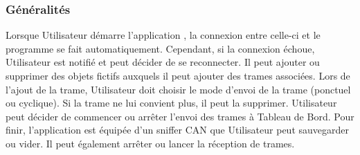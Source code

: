 \subsubsection{Généralités}
Lorsque Utilisateur démarre l'application {\nomApplication}, la connexion entre celle-ci et le programme {\nomLogiciel} se fait automatiquement. Cependant, si la connexion échoue, Utilisateur est notifié et peut décider de se reconnecter.
\newline
\newline
Il peut ajouter ou supprimer des objets fictifs auxquels il peut ajouter des trames associées. Lors de l'ajout de la trame, Utilisateur doit choisir le mode d'envoi de la trame (ponctuel ou cyclique). Si la trame ne lui convient plus, il peut la supprimer. Utilisateur peut décider de commencer ou arrêter l'envoi des trames à Tableau de Bord.
\newline
\newline
Pour finir, l'application {\nomApplication} est équipée d'un sniffer CAN que Utilisateur peut sauvegarder ou vider. Il peut également arrêter ou lancer la réception de trames.